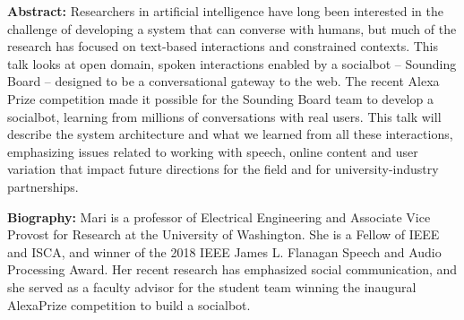 \noindent
{\bfseries Abstract:} Researchers in artificial intelligence have long been interested in the challenge of developing a system that can converse with humans, but much of the research has focused on text-based interactions and constrained contexts. This talk looks at open domain, spoken interactions enabled by a socialbot -- Sounding Board -- designed to be a conversational gateway to the web. The recent Alexa Prize competition made it possible for the Sounding Board team to develop a socialbot, learning from millions of conversations with real users. This talk will describe the system architecture and what we learned from all these interactions, emphasizing issues related to working with speech, online content and user variation that impact future directions for the field and for university-industry partnerships.

\noindent
{\bfseries Biography:} Mari is a professor of Electrical Engineering and Associate Vice Provost for Research at the University of Washington. She is a Fellow of IEEE and ISCA, and winner of the 2018 IEEE James L. Flanagan Speech and Audio Processing Award. Her recent research has emphasized social communication, and she served as a faculty advisor for the student team winning the inaugural AlexaPrize competition to build a socialbot.


\newpage
